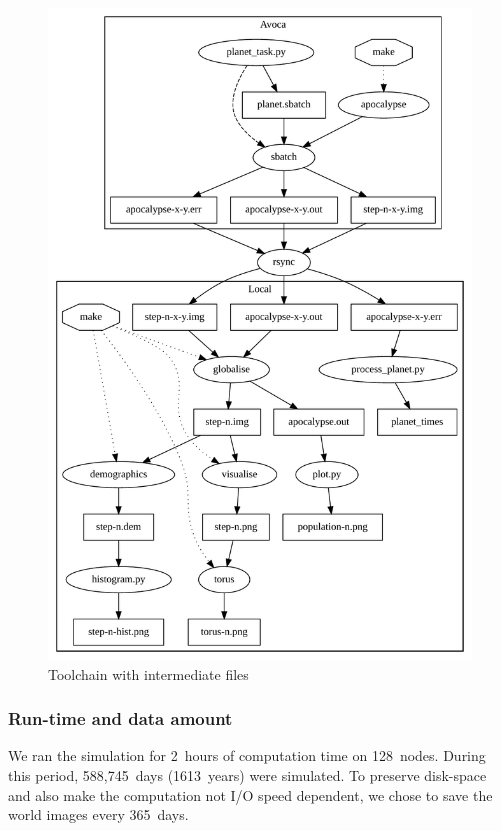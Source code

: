 \documentclass[a4paper]{article}
\begin{document}
\begin{figure}[pht]
    \centering
    \includegraphics[width=\textwidth]{toolchain}
    \caption{Toolchain with intermediate files}
\end{figure}

\subsubsection{Run-time and data amount}

We ran the simulation for 2~hours of computation time on 128~nodes.
During this period, 588,745~days (1613~years) were simulated.
To preserve disk-space and also make the computation not I/O speed dependent, we chose to save the world images every 365~days.
\end{document}
